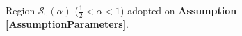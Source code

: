 \documentclass{amsart}
\theoremstyle{definition}
\theoremstyle{remark}
\numberwithin{equation}{section}
\begin{document}
\begin{figure}
			\caption{Region $\mathcal{S}_{0}(\alpha)$ ($\frac{1}{2}<\alpha<1$) adopted on {\bf Assumption \ref{AssumptionParameters}}.}\label{StrichartzFigure1} 
		\end{figure}
		
\end{document}
